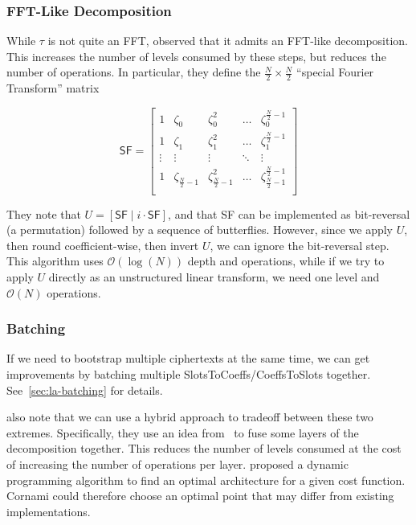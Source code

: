 \documentclass[../fheimpl.tex]{subfiles}
\begin{document}
    \subsubsection{FFT-Like Decomposition}
    While $\tau$ is not quite an FFT, \cite{cryptoeprint:2018/1043} observed that it admits an FFT-like decomposition. This increases the number of levels consumed by these steps, but reduces the number of operations. In particular, they define the $\frac{N}{2}\times\frac{N}{2}$ ``special Fourier Transform'' matrix
    
    \[\mathsf{SF}=
    \begin{bmatrix}
        1 & \zeta_0 & \zeta_0^2 & \ldots & \zeta_0^{\frac{N}{2}-1} \\
        1 & \zeta_1 & \zeta_1^2 & \ldots & \zeta_1^{\frac{N}{2}-1} \\
        \vdots & \vdots & \vdots & \ddots & \vdots \\
        1 & \zeta_{\frac{N}{2}-1} & \zeta_{\frac{N}{2}-1}^2 & \ldots & \zeta_{\frac{N}{2}-1}^{\frac{N}{2}-1} \\
        
    \end{bmatrix}
    \]
    
    They note that $U=[\mathsf{SF}\mid i\cdot\mathsf{SF}]$, and that \textsf{SF} can be implemented as bit-reversal (a permutation) followed by a sequence of butterflies. However, since we apply $U$, then round coefficient-wise, then invert $U$, we can ignore the bit-reversal step. This algorithm uses $\mathcal{O}(\log(N))$ depth and operations, while if we try to apply $U$ directly as an unstructured linear transform, we need one level and $\mathcal{O}(N)$ operations.

    \subsubsection{Batching}
    If we need to bootstrap multiple ciphertexts at the same time, we can get improvements by batching multiple SlotsToCoeffs/CoeffsToSlots together. See~\cref{sec:la-batching} for details.
    
    \cite{cryptoeprint:2018/1043,cryptoeprint:2018/1073} also note that we can use a hybrid approach to tradeoff between these two extremes. Specifically, they use an idea from~\cite{cryptoeprint:2014/106} to fuse some layers of the decomposition together. This reduces the number of levels consumed at the cost of increasing the number of operations per layer. \cite{cryptoeprint:2014/106} proposed a dynamic programming algorithm to find an optimal architecture for a given cost function. Cornami could therefore choose an optimal point that may differ from existing implementations.
\end{document}
